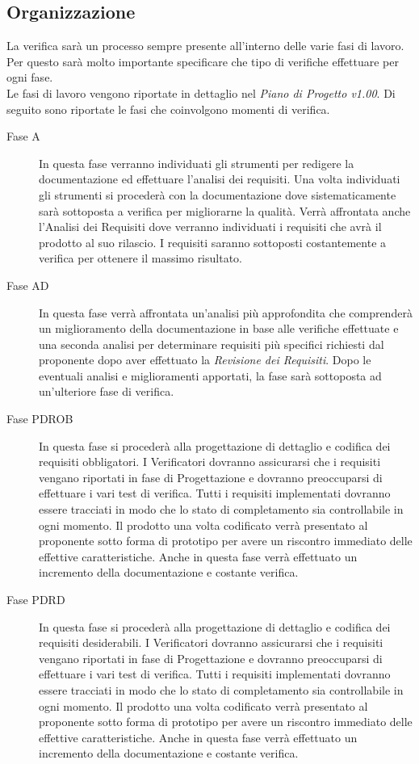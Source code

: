 \documentclass[../PianoDiQualifica.tex]{subfiles}
\begin{document}
		\subsection{Organizzazione}
		 La verifica sarà un processo sempre presente all'interno delle varie fasi di lavoro. Per questo sarà molto importante specificare che tipo di verifiche effettuare per ogni fase.
\\Le fasi di lavoro vengono riportate in dettaglio nel \textit{Piano di Progetto v1.00}. Di seguito sono riportate le fasi che coinvolgono momenti di verifica.
		 \begin{description}
		 	\item[Fase A] In questa fase verranno individuati gli strumenti per redigere la documentazione ed effettuare l'analisi dei requisiti. Una volta individuati gli strumenti si procederà con la documentazione dove sistematicamente sarà sottoposta a verifica per migliorarne la qualità. Verrà affrontata anche l'Analisi dei Requisiti dove verranno individuati i requisiti che avrà il prodotto al suo rilascio. I requisiti saranno sottoposti costantemente a verifica per ottenere il massimo risultato.
		 	\item[Fase AD] In questa fase verrà affrontata un'analisi più approfondita che comprenderà un miglioramento della documentazione in base alle verifiche effettuate e una seconda analisi per determinare requisiti più specifici richiesti dal proponente dopo aver effettuato la \textit{Revisione dei Requisiti}. Dopo le eventuali analisi e miglioramenti apportati, la fase sarà sottoposta ad un'ulteriore fase di verifica.   
		 	\item[Fase PDROB] In questa fase si procederà alla progettazione di dettaglio e codifica dei requisiti obbligatori. I Verificatori dovranno assicurarsi che i requisiti vengano riportati in fase di Progettazione e dovranno preoccuparsi di effettuare i vari test di verifica. Tutti i requisiti implementati dovranno essere tracciati in modo che lo stato di completamento sia controllabile in ogni momento. Il prodotto una volta codificato verrà presentato al proponente sotto forma di prototipo per avere un riscontro immediato delle effettive caratteristiche. Anche in questa fase verrà effettuato un incremento della documentazione e costante verifica.  
		 	\item[Fase PDRD] In questa fase si procederà alla progettazione di dettaglio e codifica dei requisiti desiderabili. I Verificatori dovranno assicurarsi che i requisiti vengano riportati in fase di Progettazione e dovranno preoccuparsi di effettuare i vari test di verifica. Tutti i requisiti implementati dovranno essere tracciati in modo che lo stato di completamento sia controllabile in ogni momento. Il prodotto una volta codificato verrà presentato al proponente sotto forma di prototipo per avere un riscontro immediato delle effettive caratteristiche. Anche in questa fase verrà effettuato un incremento della documentazione e costante verifica.

\end{description}
\end{document}
